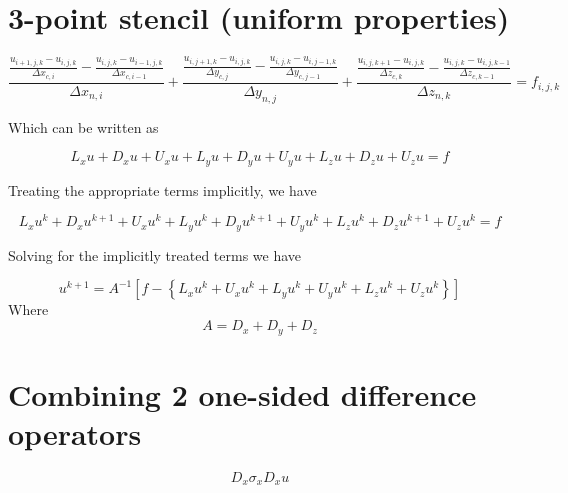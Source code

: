 \documentclass[11pt]{article}
\begin{document}
\section{3-point stencil (uniform properties)}

\begin{equation}
	\frac{\frac{u_{i+1,j,k}-u_{i,j,k}}{\Delta x_{c,i}} - \frac{u_{i,j,k}-u_{i-1,j,k}}{\Delta x_{c,i-1}}}{\Delta x_{n,i}} +
	\frac{\frac{u_{i,j+1,k}-u_{i,j,k}}{\Delta y_{c,j}} - \frac{u_{i,j,k}-u_{i,j-1,k}}{\Delta y_{c,j-1}}}{\Delta y_{n,j}} +
	\frac{\frac{u_{i,j,k+1}-u_{i,j,k}}{\Delta z_{c,k}} - \frac{u_{i,j,k}-u_{i,j,k-1}}{\Delta z_{c,k-1}}}{\Delta z_{n,k}} = f_{i,j,k}
\end{equation}

Which can be written as

\begin{equation}
	L_x u + D_x u + U_x u +
	L_y u + D_y u + U_y u +
	L_z u + D_z u + U_z u
	= f
\end{equation}

Treating the appropriate terms implicitly, we have

\begin{equation}
	L_x u^{k} + D_x u^{k+1} + U_x u^{k} +
	L_y u^{k} + D_y u^{k+1} + U_y u^{k} +
	L_z u^{k} + D_z u^{k+1} + U_z u^{k}
	= f
\end{equation}

Solving for the implicitly treated terms we have

\begin{equation}
	u^{k+1}
	=
	A^{-1}
	\left[
	f -
	\left\{
	L_x u^{k} + U_x u^{k} +
	L_y u^{k} + U_y u^{k} +
	L_z u^{k} + U_z u^{k}
	\right\}
	\right]
\end{equation}
Where
\begin{equation}
	A =
	D_x +
	D_y +
	D_z
\end{equation}

\section{Combining 2 one-sided difference operators}
\begin{equation}
	D_x \sigma_x D_x u
\end{equation}
\end{document}
